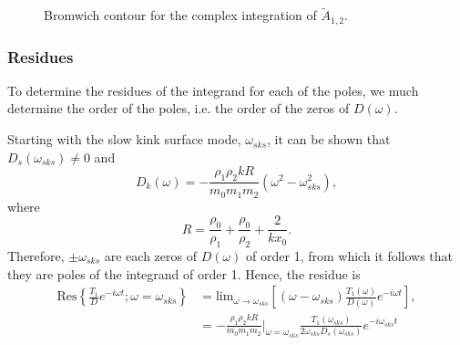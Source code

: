 \documentclass[12pt]{article}
\begin{document}
\begin{figure}
{ 
	}
	\caption{Bromwich contour for the complex integration of $\tilde{A}_{1,2}$.}
	\label{fig: brom cont incomp}
\end{figure}

\subsubsection{Residues}
To determine the residues of the integrand for each of the poles, we much determine the order of the poles, i.e. the order of the zeros of $D(\omega)$.

Starting with the slow kink surface mode, $\omega_{sks}$, it can be shown that $D_s(\omega_{sks}) \neq 0$ and
\begin{equation}
D_k(\omega) = - \frac{\rho_1\rho_2kR}{m_0m_1m_2}(\omega^2 - \omega_{sks}^2),
\end{equation}
where
\begin{equation}
R = \frac{\rho_0}{\rho_1} + \frac{\rho_0}{\rho_2} + \frac{2}{kx_0}.
\end{equation}
Therefore, $\pm \omega_{sks}$ are each zeros of $D(\omega)$ of order 1, from which it follows that they are poles of the integrand of order 1. Hence, the residue is
\begin{align}
\mathrm{Res}\left\{\frac{T_1}{D}e^{-i\omega t}; \omega = \omega_{sks} \right\} &= \mathrm{lim}_{\omega \to \omega_{sks}} \left[ (\omega - \omega_{sks}) \frac{T_1(\omega)}{D(\omega)} e^{-i\omega t} \right], \\
&= - \frac{\rho_1\rho_2kR}{m_0m_1m_2}|_{\omega = \omega_{sks}} \frac{T_1(\omega_{sks})}{2\omega_{sks}D_s(\omega_{sks})}e^{-i\omega_{sks} t}
\end{align}


\appendix
\end{document}
